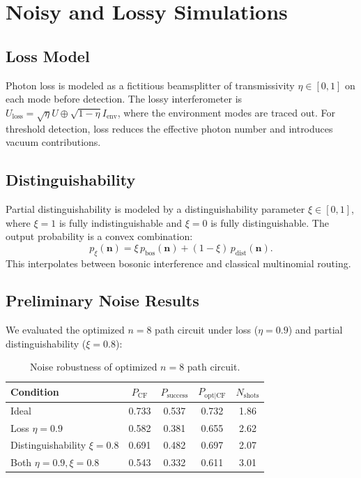 \section{Noisy and Lossy Simulations}
\label{sec:noisy}

\subsection{Loss Model}

Photon loss is modeled as a fictitious beamsplitter of transmissivity $\eta \in [0,1]$ on each mode before detection. The lossy interferometer is $U_{\mathrm{loss}} = \sqrt{\eta} U \oplus \sqrt{1-\eta} I_{\mathrm{env}}$, where the environment modes are traced out. For threshold detection, loss reduces the effective photon number and introduces vacuum contributions.

\subsection{Distinguishability}

Partial distinguishability is modeled by a distinguishability parameter $\xi \in [0,1]$, where $\xi=1$ is fully indistinguishable and $\xi=0$ is fully distinguishable. The output probability is a convex combination:
\begin{equation}
p_{\xi}(\mathbf{n}) = \xi \, p_{\mathrm{bos}}(\mathbf{n}) + (1-\xi) \, p_{\mathrm{dist}}(\mathbf{n}).
\end{equation}
This interpolates between bosonic interference and classical multinomial routing.

\subsection{Preliminary Noise Results}

We evaluated the optimized $n=8$ path circuit under loss ($\eta=0.9$) and partial distinguishability ($\xi=0.8$):

\begin{table}[ht]
\centering
\caption{Noise robustness of optimized $n=8$ path circuit.}
\label{tab:noise_robustness}
\begin{tabular}{lcccc}
\toprule
Condition & $P_{\mathrm{CF}}$ & $P_{\mathrm{success}}$ & $P_{\mathrm{opt|CF}}$ & $N_{\mathrm{shots}}$ \\
\midrule
Ideal & 0.733 & 0.537 & 0.732 & 1.86 \\
Loss $\eta=0.9$ & 0.582 & 0.381 & 0.655 & 2.62 \\
Distinguishability $\xi=0.8$ & 0.691 & 0.482 & 0.697 & 2.07 \\
Both $\eta=0.9, \xi=0.8$ & 0.543 & 0.332 & 0.611 & 3.01 \\
\bottomrule
\end{tabular}
\end{table}

